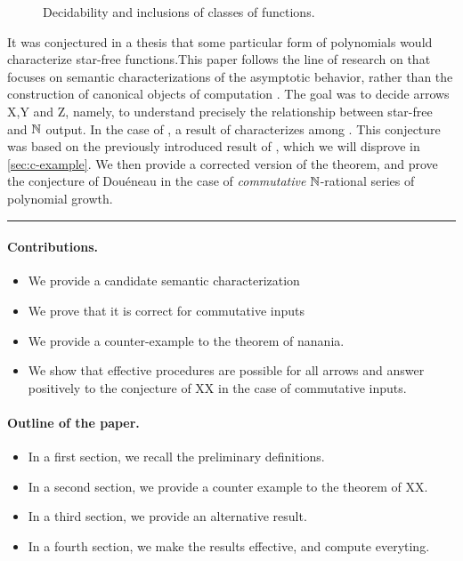\begin{figure}
    
    \caption{
        Decidability and inclusions of classes of functions. 
    }
\end{figure}

It was conjectured in a thesis that some particular form of polynomials
would characterize star-free functions.This paper follows the line of
research on  that focuses on semantic
characterizations of the asymptotic behavior, rather than the construction
of canonical objects of computation
\cite{doueneau2021pebble,doueneau2022hiding,LOPEZ23b}. The goal was to
decide arrows X,Y and Z, namely, to understand precisely the relationship
between star-free and $\mathbb{N}$ output. In the case of , a result of \citeauthor{KARH77} characterizes 
 among 
\cite{KARH77}.
This conjecture was based on the previously introduced result of
\textcite[Theorem 3.3]{KARH77}, which we will disprove in \cref{sec:c-example}.
We then provide a corrected version of the theorem, and prove the conjecture of
Douéneau in the case of \emph{commutative} $\mathbb{N}$-rational series of polynomial
growth.

\hrule

\paragraph{Contributions.} 
\begin{itemize}
    \item We provide a candidate semantic characterization
    \item We prove that it is correct for commutative inputs
    \item We provide a counter-example to the theorem of nanania.
    \item We show that effective procedures are possible for all arrows 
        and answer positively to the conjecture of XX
        in the case of commutative inputs.
\end{itemize}


\paragraph*{Outline of the paper.}
\begin{itemize}
    \item In a first section, we recall the preliminary definitions.
    \item In a second section, we provide a counter example to the
        theorem of XX.
    \item In a third section, we provide an alternative result.
    \item In a fourth section, we make the results effective,
        and compute everyting.
\end{itemize}
